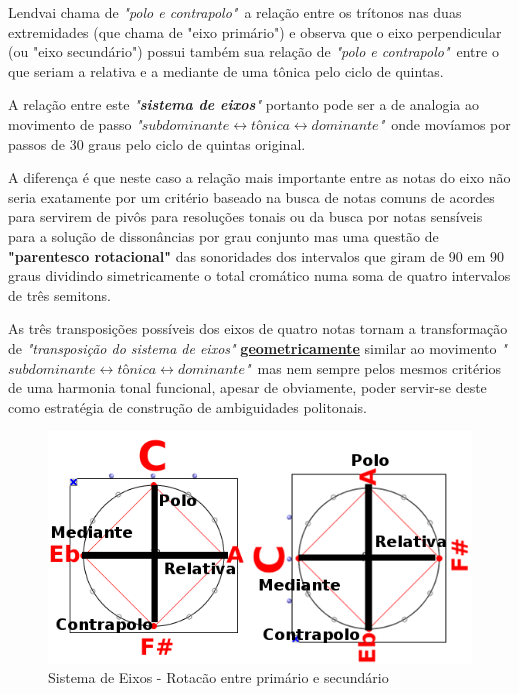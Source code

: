 \documentclass[
	12pt,				%
	openright,			%
	twoside,			%
	a4paper,			%
	english,			%
	french,				%
	spanish,			%
	brazil				%
	]{abntex2}
\begin{document}
Lendvai chama de \textit{"polo e contrapolo"}\ a relação entre os trítonos nas duas extremidades (que chama de "eixo primário") e observa que o eixo perpendicular (ou "eixo secundário") possui também sua relação de \textit{"polo e contrapolo"}\ entre o que seriam a relativa e a mediante de uma tônica pelo ciclo de quintas. 

A relação entre este \textit{"\textbf{sistema de eixos}"} portanto pode ser a de analogia ao movimento de passo \textit{"$subdominante \leftrightarrow tônica \leftrightarrow dominante$"}\ onde movíamos por passos de 30 graus pelo ciclo de quintas original.  

A diferença é que neste caso a relação mais importante entre as notas do eixo não seria exatamente por um critério baseado na busca de notas comuns de acordes para servirem de pivôs para resoluções tonais ou da busca por notas sensíveis para a solução de dissonâncias por grau conjunto mas uma questão de \textbf{"\textbf{parentesco rotacional}"} das sonoridades dos intervalos que giram de 90 em 90 graus dividindo simetricamente o total cromático numa soma de quatro intervalos de três semitons.

As três transposições possíveis dos eixos de quatro notas tornam a transformação de \textit{"transposição do sistema de eixos"} \textbf{\textbf{\underline{geometricamente}}} similar ao movimento \textit{"$subdominante \leftrightarrow tônica \leftrightarrow dominante$"}\ mas nem sempre pelos mesmos critérios de uma harmonia tonal funcional, apesar de obviamente, poder servir-se deste como estratégia de construção de ambiguidades politonais.

\begin{figure}[!h]
	\caption{\label{fig_grafico}Sistema de Eixos - Rotacão entre primário e secundário}
	\begin{center}
	    \includegraphics[scale=0.6]{axis/PoloContrapolo.png}
	\end{center}
\end{figure}
\end{document}
